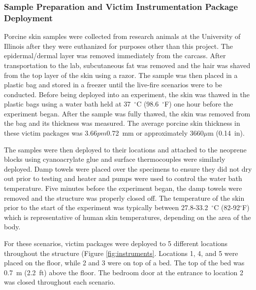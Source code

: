 \documentclass[12pt,oneside]{book}
\begin{document}
\subsubsection{Sample Preparation and Victim Instrumentation Package Deployment}
Porcine skin samples were collected from research animals at the University of Illinois after they were euthanized for purposes other than this project. The epidermal/dermal layer was removed immediately from the carcass.  After transportation to the lab, subcutaneous fat was removed and the hair was shaved from the top layer of the skin using a razor. The sample was then placed in a plastic bag and stored in a freezer until the live-fire scenarios were to be conducted. Before being deployed into an experiment, the skin was thawed in the plastic bags using a water bath held at 37~$^\circ$C (98.6~$^\circ$F) one hour before the experiment began. After the sample was fully thawed, the skin was removed from the bag and its thickness was measured. The average porcine skin thickness in these victim packages was 3.66$pm$0.72~mm or approximately 3660$\mu$m (0.14~in).  

The samples were then deployed to their locations and attached to the neoprene blocks using cyanoacrylate glue and surface thermocouples were similarly deployed. Damp towels were placed over the specimens to ensure they did not dry out prior to testing and heater and pumps were used to control the water bath temperature. Five minutes before the experiment began, the damp towels were removed and the structure was properly closed off. The temperature of the skin prior to the start of the experiment was typically between 27.8-33.2~$^\circ$C (82-92$^\circ$F) which is representative of human skin temperatures, depending on the area of the body.

For these scenarios, victim packages were deployed to 5 different locations throughout the structure (Figure \ref{fig:instruments}.  Locations 1, 4, and 5 were placed on the floor, while 2 and 3 were on top of a bed. The top of the bed was 0.7~m (2.2~ft) above the floor.  The bedroom door at the entrance to location 2 was closed throughout each scenario.  
\end{document}
